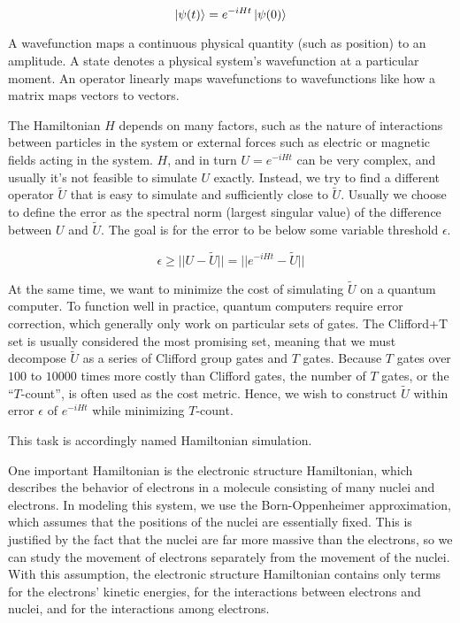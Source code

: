 \begin{equation}
    \ket{\psi(t)} = e^{-iHt}\ket{\psi(0)}
\end{equation}

A wavefunction maps a continuous physical quantity (such as position) to an amplitude. A state denotes a physical system's wavefunction at a particular moment. An operator linearly maps wavefunctions to wavefunctions like how a matrix maps vectors to vectors.

The Hamiltonian $H$ depends on many factors, such as the nature of interactions between particles in the system or external forces such as electric or magnetic fields acting in the system. $H$, and in turn $U = e^{-iHt}$ can be very complex, and usually it's not feasible to simulate $U$ exactly. Instead, we try to find a different operator $\tilde{U}$ that is easy to simulate and sufficiently close to $\tilde{U}$. Usually we choose to define the error as the spectral norm (largest singular value) of the difference between $U$ and $\tilde{U}$. The goal is for the error to be below some variable threshold $\epsilon$.

\begin{equation}
    \epsilon \geq ||U - \tilde{U}|| = ||e^{-iHt} - \tilde{U}||
\end{equation}

At the same time, we want to minimize the cost of simulating $\tilde{U}$ on a quantum computer. To function well in practice, quantum computers require error correction, which generally only work on particular sets of gates. The Clifford+T set is usually considered the most promising set, meaning that we must decompose $\tilde{U}$ as a series of Clifford group gates and $T$ gates. Because $T$ gates over $100$ to $10000$ times \cite{DF} more costly than Clifford gates, the number of $T$ gates, or the ``$T$-count'', is often used as the cost metric. Hence, we wish to construct $\tilde{U}$ within error $\epsilon$ of $e^{-iHt}$ while minimizing $T$-count.

This task is accordingly named Hamiltonian simulation.

One important Hamiltonian is the electronic structure Hamiltonian, which describes the behavior of electrons in a molecule consisting of many nuclei and electrons. In modeling this system, we use the Born-Oppenheimer approximation, which assumes that the positions of the nuclei are essentially fixed. This is justified by the fact that the nuclei are far more massive than the electrons, so we can study the movement of electrons separately from the movement of the nuclei. With this assumption, the electronic structure Hamiltonian contains only terms for the electrons' kinetic energies, for the interactions between electrons and nuclei, and for the interactions among electrons.

